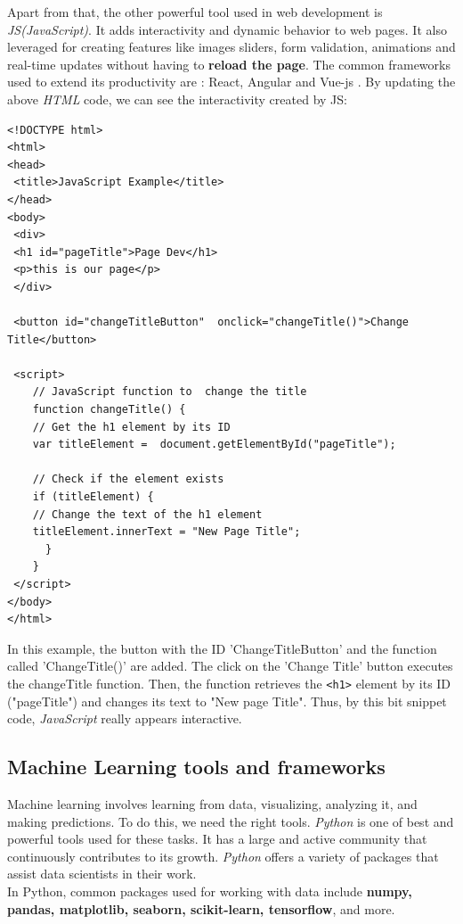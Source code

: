 \documentclass[12pt,a4paper, oneside]{book}
\begin{document}
Apart from that, the other powerful tool used in web development is \textit{JS(JavaScript)}. It adds interactivity and dynamic behavior to web pages. It also leveraged for creating features like images sliders, form validation, animations and real-time updates without having to \textbf{reload the page}. The common frameworks used to extend its productivity are : React, Angular and Vue-js \citep{wohlgethan2018supportingweb}. By updating the above \textit{HTML} code, we can see the interactivity created by JS: 
\begin{lstlisting}[style=htmlcssjsstyle, label=lst:jsCode]
<!DOCTYPE html>
<html>
<head>
 <title>JavaScript Example</title>
</head>
<body>
 <div>
 <h1 id="pageTitle">Page Dev</h1>
 <p>this is our page</p>
 </div>
	
 <button id="changeTitleButton"  onclick="changeTitle()">Change  Title</button>
	
 <script>
 	// JavaScript function to  change the title
 	function changeTitle() {
 	// Get the h1 element by its ID
 	var titleElement =  document.getElementById("pageTitle");
	
 	// Check if the element exists
 	if (titleElement) {
	// Change the text of the h1 element
 	titleElement.innerText = "New Page Title";
	  }
	}
 </script>
</body>
</html>	
\end{lstlisting} 

In this example, the button with the ID 'ChangeTitleButton' and the function called 'ChangeTitle()' are added. The click on the 'Change Title' button executes the changeTitle function. Then, the function retrieves the \texttt{<h1>} element by its
ID ("pageTitle") and changes its text to "New page Title". Thus, by this bit snippet code, \textit{JavaScript} really appears interactive.

\subsection{\large Machine Learning tools and frameworks} 
Machine learning involves learning from data, visualizing, analyzing it, and making predictions. To do this, we need the right tools. \textit{Python} is one of best and powerful tools used for these tasks. It has a large and active community that continuously contributes to its growth. \textit{Python} offers a variety of packages that assist data scientists in their work.\\

In Python, common packages used for working with data include\textbf{ numpy, pandas, matplotlib, seaborn, scikit-learn, tensorflow}, and more.
\end{document}
